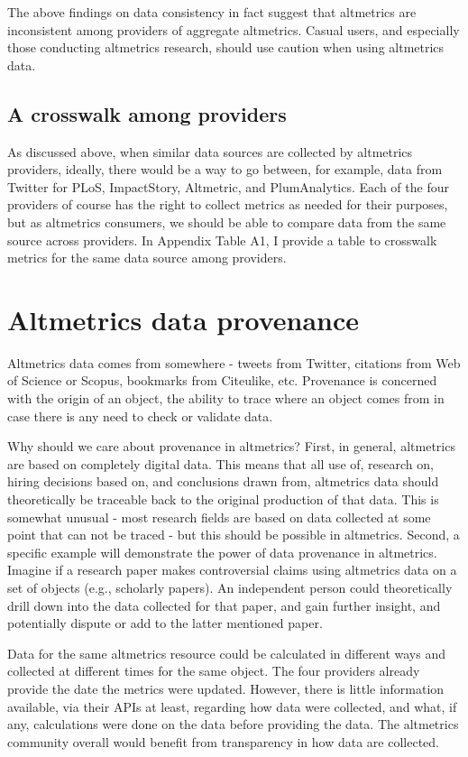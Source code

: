 \documentclass[letterpaper,superscriptaddress,showkeys,longbibliography]{revtex4-1}\usepackage{graphicx, color}
\begin{document}
The above findings on data consistency in fact suggest that altmetrics are inconsistent among providers of aggregate altmetrics. Casual users, and especially those conducting altmetrics research, should use caution when using altmetrics data.  

\subsection*{A crosswalk among providers}

As discussed above, when similar data sources are collected by altmetrics providers, ideally, there would be a way to go between, for example, data from Twitter for PLoS, ImpactStory, Altmetric, and PlumAnalytics. Each of the four providers of course has the right to collect metrics as needed for their purposes, but as altmetrics consumers, we should be able to compare data from the same source across providers. In Appendix Table A1, I provide a table to crosswalk metrics for the same data source among providers.

\section*{Altmetrics data provenance}

Altmetrics data comes from somewhere - tweets from Twitter, citations from Web of Science or Scopus, bookmarks from Citeulike, etc. Provenance is concerned with the origin of an object, the ability to trace where an object comes from in case there is any need to check or validate data. 

Why should we care about provenance in altmetrics?  First, in general, altmetrics are based on completely digital data. This means that all use of, research on, hiring decisions based on, and conclusions drawn from, altmetrics data should theoretically be traceable back to the original production of that data. This is somewhat unusual - most research fields are based on data collected at some point that can not be traced - but this should be possible in altmetrics. Second, a specific example will demonstrate the power of data provenance in altmetrics. Imagine if a research paper makes controversial claims using altmetrics data on a set of objects (e.g., scholarly papers). An independent person could theoretically drill down into the data collected for that paper, and gain further insight, and potentially dispute or add to the latter mentioned paper.

Data for the same altmetrics resource could be calculated in different ways and collected at different times for the same object. The four providers already provide the date the metrics were updated. However, there is little information available, via their APIs at least, regarding how data were collected, and what, if any, calculations were done on the data before providing the data. The altmetrics community overall would benefit from transparency in how data are collected. 
\end{document}
